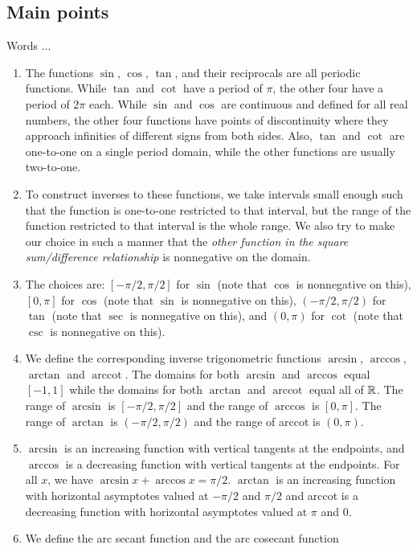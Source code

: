 \documentclass[10pt]{amsart}
\begin{document}
\subsection{Main points}

Words ...

\begin{enumerate}
\item The functions $\sin$, $\cos$, $\tan$, and their reciprocals are
  all periodic functions. While $\tan$ and $\cot$ have a period of
  $\pi$, the other four have a period of $2\pi$ each. While $\sin$ and
  $\cos$ are continuous and defined for all real numbers, the other
  four functions have points of discontinuity where they approach
  infinities of different signs from both sides. Also, $\tan$ and
  $\cot$ are one-to-one on a single period domain, while the other
  functions are usually two-to-one.
\item To construct inverses to these functions, we take intervals
  small enough such that the function is one-to-one restricted to that
  interval, but the range of the function restricted to that interval
  is the whole range. We also try to make our choice in such a manner
  that the {\em other function in the square sum/difference
  relationship} is nonnegative on the domain.
\item The choices are: $[-\pi/2,\pi/2]$ for $\sin$ (note that $\cos$
  is nonnegative on this), $[0,\pi]$ for $\cos$ (note that $\sin$ is
  nonnegative on this), $(-\pi/2,\pi/2)$ for $\tan$ (note that $\sec$
  is nonnegative on this), and $(0,\pi)$ for $\cot$ (note that $\csc$
  is nonnegative on this).
\item We define the corresponding inverse trigonometric functions
  $\arcsin$, $\arccos$, $\arctan$ and $\operatorname{arccot}$. The
  domains for both $\arcsin$ and $\arccos$ equal $[-1,1]$ while the
  domains for both $\arctan$ and $\operatorname{arccot}$ equal all of
  $\mathbb{R}$. The range of $\arcsin$ is $[-\pi/2, \pi/2]$ and the range of
  $\arccos$ is $[0,\pi]$. The range of $\arctan$ is $(-\pi/2,\pi/2)$
  and the range of arccot is $(0,\pi)$.
\item $\arcsin$ is an increasing function with vertical tangents at
  the endpoints, and $\arccos$ is a decreasing function with vertical
  tangents at the endpoints. For all $x$, we have $\arcsin x + \arccos
  x = \pi/2$. $\arctan$ is an increasing function with horizontal
  asymptotes valued at $-\pi/2$ and $\pi/2$ and arccot is a decreasing
  function with horizontal asymptotes valued at $\pi$ and $0$.
\item We define the arc secant function and the arc cosecant function

\end{enumerate}
\end{document}
